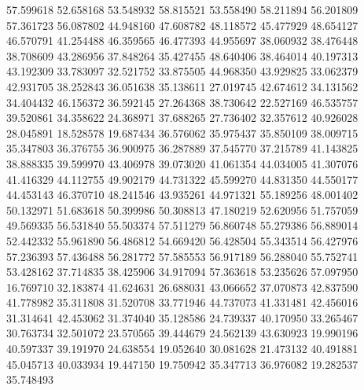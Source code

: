57.599618
52.658168
53.548932
58.815521
53.558490
58.211894
56.201809
57.361723
56.087802
44.948160
47.608782
48.118572
45.477929
48.654127
46.570791
41.254488
46.359565
46.477393
44.955697
38.060932
38.476448
38.708609
43.286956
37.848264
35.427455
48.640406
38.464014
40.197313
43.192309
33.783097
32.521752
33.875505
44.968350
43.929825
33.062379
42.931705
38.252843
36.051638
35.138611
27.019745
42.674612
34.131562
34.404432
46.156372
36.592145
27.264368
38.730642
22.527169
46.535757
39.520861
34.358622
24.368971
37.688265
27.736402
32.357612
40.926028
28.045891
18.528578
19.687434
36.576062
35.975437
35.850109
38.009715
35.347803
36.376755
36.900975
36.287889
37.545770
37.215789
41.143825
38.888335
39.599970
43.406978
39.073020
41.061354
44.034005
41.307076
41.416329
44.112755
49.902179
44.731322
45.599270
44.831350
44.550177
44.453143
46.370710
48.241546
43.935261
44.971321
55.189256
48.001402
50.132971
51.683618
50.399986
50.308813
47.180219
52.620956
51.757059
49.569335
56.531840
55.503374
57.511279
56.860748
55.279386
56.889014
52.442332
55.961890
56.486812
54.669420
56.428504
55.343514
56.427976
57.236393
57.436488
56.281772
57.585553
56.917189
56.288040
55.752741
53.428162
37.714835
38.425906
34.917094
57.363618
53.235626
57.097950
16.769710
32.183874
41.624631
26.688031
43.066652
37.070873
42.837590
41.778982
35.311808
31.520708
33.771946
44.737073
41.331481
42.456016
31.314641
42.453062
31.374040
35.128586
24.739337
40.170950
33.265467
30.763734
32.501072
23.570565
39.444679
24.562139
43.630923
19.990196
40.597337
39.191970
24.638554
19.052640
30.081628
21.473132
40.491881
45.045713
40.033934
19.447150
19.750942
35.347713
36.976082
19.282537
35.748493
